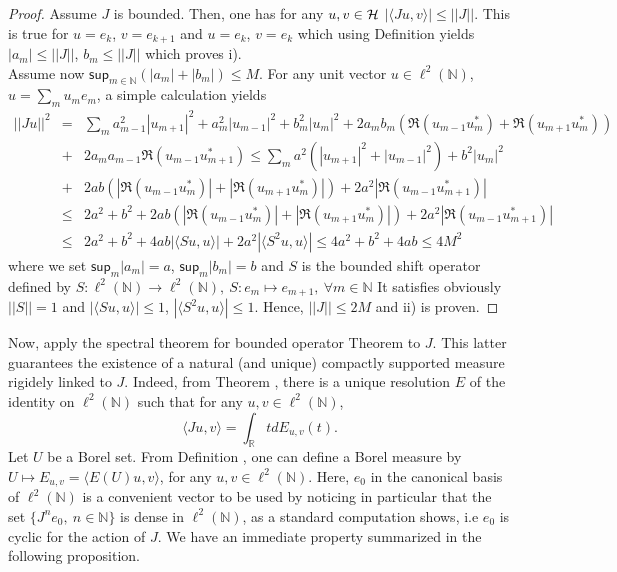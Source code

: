 \documentclass[10pt]{book}
\renewcommand{\sup}{\mathsf{sup}}
\theoremstyle{break}
\begin{document}
\begin{proof}
Assume $J$ is bounded. Then, one has for any $u,v\in\cal{H}$ $|\langle Ju,v \rangle|\le ||J||$. This is true for $u=e_k$, $v=e_{k+1}$ and $u=e_k$, $v=e_k$ which using Definition %
yields $|a_m|\le||J||$, $b_m\le||J||$ which proves i). \\
Assume now $\sup_{m\in\mathbb{N}}(|a_m|+|b_m|)\le M$. For any unit vector $u\in\ell^2(\mathbb{N})$, $u=\sum_mu_me_m$, a simple calculation yields
\begin{eqnarray}
||Ju||^2&=&\sum_ma^2_{m-1}|u_{m+1}|^2+a^2_m|u_{m-1}|^2+b^2_m|u_m|^2+2a_mb_m(\Re(u_{m-1}u^*_m)+\Re(u_{m+1}u^*_m))\nonumber\\
&+&2a_ma_{m-1}\Re(u_{m-1}u^*_{m+1})\le\sum_ma^2(|u_{m+1}|^2+|u_{m-1}|^2)+b^2|u_m|^2\nonumber\\
&+&2ab(|\Re(u_{m-1}u^*_m)|+|\Re(u_{m+1}u^*_m)|)+2a^2|\Re(u_{m-1}u^*_{m+1})|\nonumber\\
&\le&2a^2+b^2+2ab(|\Re(u_{m-1}u^*_m)|+|\Re(u_{m+1}u^*_m)|)+2a^2|\Re(u_{m-1}u^*_{m+1})|\nonumber\\
&\le&2a^2+b^2+4ab|\langle Su,u \rangle|+2a^2|\langle S^2u,u\rangle|\le4a^2+b^2+4ab\le4M^2
\end{eqnarray}
where we set $\sup_m|a_m|=a$, $\sup_m|b_m|=b$ and $S$ is the bounded shift operator defined by $
S:\ell^2(\mathbb{N})\to\ell^2(\mathbb{N}),\ S:e_m\mapsto e_{m+1},\ \forall m\in\mathbb{N}$
It satisfies obviously $||S||=1$ and $|\langle Su,u\rangle|\le1$, $|\langle S^2u,u \rangle|\le1$. Hence, $||J||\le2M$ and ii) is proven.
\end{proof} 
Now, apply the spectral theorem for bounded operator Theorem %
to $J$. This latter guarantees the existence of a natural (and unique) compactly supported measure rigidely linked to $J$. Indeed, from Theorem %
, there is a unique resolution $E$ of the identity on $\ell^2(\mathbb{N})$ such that for any $u,v\in\ell^2(\mathbb{N})$, 
\begin{equation}
\langle Ju,v \rangle=\int_\mathbb{R}tdE_{u,v}(t). 
\end{equation}
Let $U$ be a Borel set. From Definition %
, one can define a Borel measure by $U\mapsto E_{u,v}=\langle E(U)u,v \rangle$, for any $u,v\in\ell^2(\mathbb{N})$. Here, $e_0$ in the canonical basis of $\ell^2(\mathbb{N})$ is a convenient vector to be used by noticing in particular that the set $\{J^ne_0,\ n\in\mathbb{N}\}$ is dense in $\ell^2(\mathbb{N})$, as a standard computation shows, i.e $e_0$ is cyclic for the action of $J$. We have an immediate property summarized in the following proposition.
\end{document}
